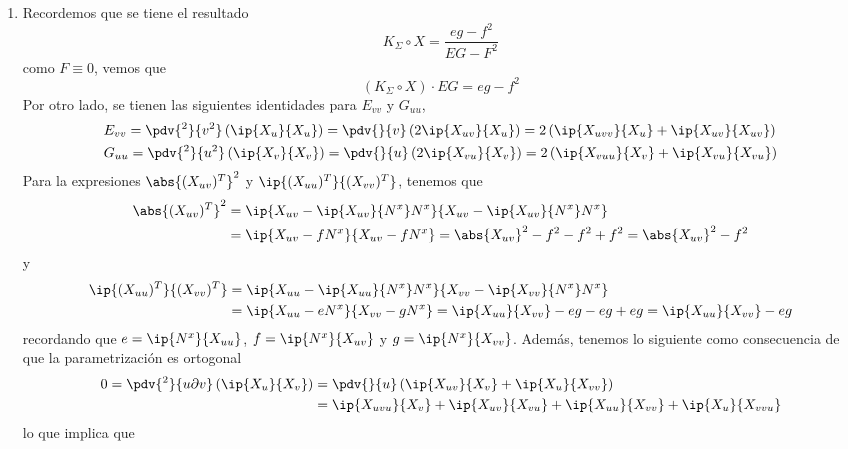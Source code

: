 \documentclass{article}
\begin{document}
\begin{enumerate}
    \item Recordemos que se tiene el resultado
    \begin{equation*}
        K_{\Sigma}\circ X=\frac{eg-f^{2}}{EG-F^{2}}
    \end{equation*}
    como $F\equiv0$, vemos que
    \begin{equation*}
        (K_{\Sigma}\circ X)\cdot EG=eg-f^{2}
    \end{equation*}
    Por otro lado, se tienen las siguientes identidades para $E_{vv}$ y $G_{uu}$,
    \begin{align*}
        & E_{vv}=\pdv{^{2}}{v^{2}}\left(\ip{X_{u}}{X_{u}}\right)
        =\pdv{}{v}\left(2\ip{X_{uv}}{X_{u}}\right)
        =2\left(\ip{X_{uvv}}{X_{u}}+\ip{X_{uv}}{X_{uv}}\right) \\
        & G_{uu}=\pdv{^{2}}{u^{2}}\left(\ip{X_{v}}{X_{v}}\right)
        =\pdv{}{u}\left(2\ip{X_{vu}}{X_{v}}\right)
        =2\left(\ip{X_{vuu}}{X_{v}}+\ip{X_{vu}}{X_{vu}}\right)
    \end{align*}
    Para la expresiones $\abs{(X_{uv})^{T}}^{2}$ y $\ip{(X_{uu})^{T}}{(X_{vv})^{T}}$, tenemos que
    \begin{align*}
        \abs{(X_{uv})^{T}}^{2} &= \ip{X_{uv}-\ip{X_{uv}}{N^{x}}N^{x}}
        {X_{uv}-\ip{X_{uv}}{N^{x}}N^{x}} \\
        &= \ip{X_{uv}-fN^{x}}{X_{uv}-fN^{x}}=\abs{X_{uv}}^{2}-f^{2}-f^{2}+f^{2}
        =\abs{X_{uv}}^{2}-f^{2}
    \end{align*}
    y
    \begin{align*}
        \ip{(X_{uu})^{T}}{(X_{vv})^{T}} &= \ip{X_{uu}-\ip{X_{uu}}{N^{x}}N^{x}}{X_{vv}-\ip{X_{vv}}
        {N^{x}}N^{x}} \\
        &= \ip{X_{uu}-eN^{x}}{X_{vv}-gN^{x}}=\ip{X_{uu}}{X_{vv}}-eg-eg+eg=\ip{X_{uu}}{X_{vv}}-eg
    \end{align*}
    recordando que $e=\ip{N^{x}}{X_{uu}}$, $f=\ip{N^{x}}{X_{uv}}$ y $g=\ip{N^{x}}{X_{vv}}$. 
    Además, tenemos lo siguiente como consecuencia de que la parametrización es ortogonal
    \begin{align*}
        0=\pdv{^{2}}{u\partial v}\left(\ip{X_{u}}{X_{v}}\right)
        &= \pdv{}{u}\left(\ip{X_{uv}}{X_{v}}+\ip{X_{u}}{X_{vv}}\right) \\
        &= \ip{X_{uvu}}{X_{v}}+\ip{X_{uv}}{X_{vu}}+\ip{X_{uu}}{X_{vv}}+\ip{X_{u}}{X_{vvu}}
    \end{align*}
    lo que implica que
    \begin{equation*}

\end{equation*}
\end{enumerate}
\end{document}
